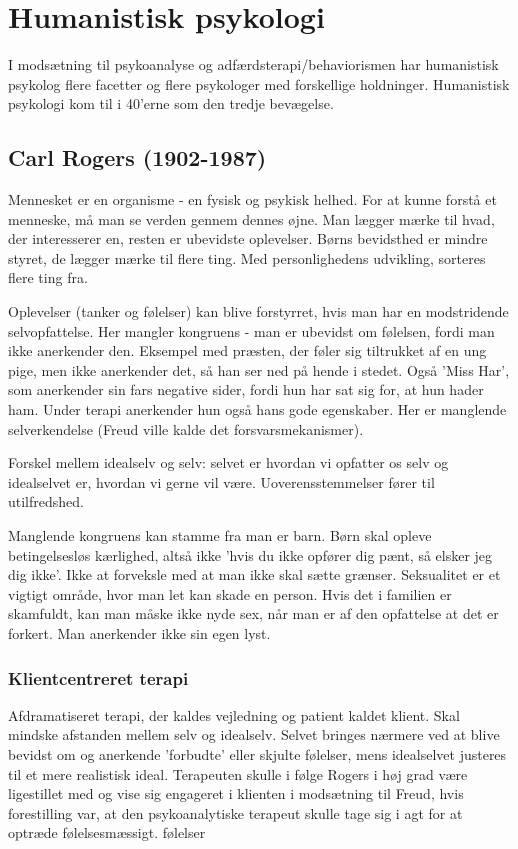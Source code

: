 

\section{Humanistisk psykologi}

I modsætning til psykoanalyse og adfærdsterapi/behaviorismen har
humanistisk psykolog flere facetter og flere psykologer med forskellige
holdninger. Humanistisk psykologi kom til i 40'erne som den tredje
bevægelse.

\subsection{Carl Rogers (1902-1987)}

Mennesket er en organisme - en fysisk og psykisk helhed. For at kunne
forstå et menneske, må man se verden gennem dennes øjne. Man lægger mærke 
til hvad, der interesserer en, resten er ubevidste oplevelser. Børns 
bevidsthed er mindre styret, de lægger mærke til flere ting. Med 
personlighedens udvikling, sorteres flere ting fra.

Oplevelser (tanker og følelser) kan blive forstyrret, hvis man har en 
modstridende selvopfattelse. Her mangler kongruens - man er ubevidst om 
følelsen, fordi man ikke anerkender den. Eksempel med præsten, der føler 
sig tiltrukket af en ung pige, men ikke anerkender det, så han ser ned på 
hende i stedet. Også 'Miss Har', som anerkender sin fars negative sider, 
fordi hun har sat sig for, at hun hader ham. Under terapi anerkender hun 
også hans gode egenskaber. Her er manglende selverkendelse (Freud ville 
kalde det forsvarsmekanismer).

Forskel mellem idealselv og selv: selvet er hvordan vi opfatter os selv 
og idealselvet er, hvordan vi gerne vil være. Uoverensstemmelser fører 
til utilfredshed.

Manglende kongruens kan stamme fra man er barn. Børn skal opleve 
betingelsesløs kærlighed, altså ikke 'hvis du ikke opfører dig pænt, 
så elsker jeg dig ikke'. Ikke at forveksle med at man ikke skal sætte 
grænser. Seksualitet er et vigtigt område, hvor man let kan skade en person. 
Hvis det i familien er skamfuldt, kan man måske ikke nyde sex, når man er 
af den opfattelse at det er forkert. Man anerkender ikke sin egen lyst.

\subsubsection{Klientcentreret terapi}

Afdramatiseret terapi, der kaldes vejledning og patient kaldet klient. Skal 
mindske afstanden mellem selv og idealselv. Selvet bringes nærmere ved 
at blive bevidst om og anerkende 'forbudte' eller skjulte følelser, mens 
idealselvet justeres til et mere realistisk ideal. Terapeuten skulle i 
følge Rogers i høj grad være ligestillet med og vise sig  engageret 
i klienten i modsætning til Freud, hvis forestilling var, at den 
psykoanalytiske terapeut skulle tage sig i agt for at optræde 
følelsesmæssigt.
følelser
